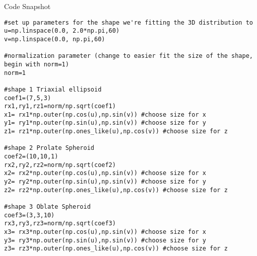 \documentclass{aastex63}
\begin{document}
\newpage
\begin{tcolorbox}
Code Snapshot
\begin{verbatim}
#set up parameters for the shape we're fitting the 3D distribution to
u=np.linspace(0.0, 2.0*np.pi,60)
v=np.linspace(0.0, np.pi,60)

#normalization parameter (change to easier fit the size of the shape, begin with norm=1)
norm=1

#shape 1 Triaxial ellipsoid
coef1=(7,5,3)
rx1,ry1,rz1=norm/np.sqrt(coef1)
x1= rx1*np.outer(np.cos(u),np.sin(v)) #choose size for x
y1= ry1*np.outer(np.sin(u),np.sin(v)) #choose size for y
z1= rz1*np.outer(np.ones_like(u),np.cos(v)) #choose size for z

#shape 2 Prolate Spheroid
coef2=(10,10,1)
rx2,ry2,rz2=norm/np.sqrt(coef2)
x2= rx2*np.outer(np.cos(u),np.sin(v)) #choose size for x
y2= ry2*np.outer(np.sin(u),np.sin(v)) #choose size for y
z2= rz2*np.outer(np.ones_like(u),np.cos(v)) #choose size for z

#shape 3 Oblate Spheroid
coef3=(3,3,10)
rx3,ry3,rz3=norm/np.sqrt(coef3)
x3= rx3*np.outer(np.cos(u),np.sin(v)) #choose size for x
y3= ry3*np.outer(np.sin(u),np.sin(v)) #choose size for y
z3= rz3*np.outer(np.ones_like(u),np.cos(v)) #choose size for z
\end{verbatim}
\end{tcolorbox}
\end{document}
